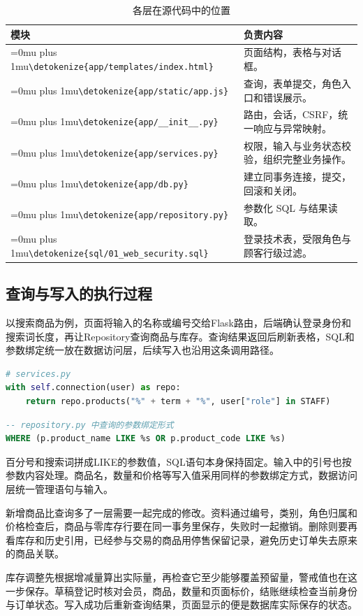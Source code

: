 \documentclass{SYSUReport}
\newcommand{\code}[1]{\begingroup\Urlmuskip=0mu plus 1mu\expandafter\nolinkurl\expandafter{\detokenize{#1}}\endgroup}
\begin{document}
\begin{table}[H]\centering\small
\begin{tabularx}{\textwidth}{P{6.0cm}Y}
\toprule 模块 & 负责内容 \\
\midrule
\code{app/templates/index.html} & 页面结构，表格与对话框。 \\
\code{app/static/app.js} & 查询，表单提交，角色入口和错误展示。 \\
\code{app/__init__.py} & 路由，会话，CSRF，统一响应与异常映射。 \\
\code{app/services.py} & 权限，输入与业务状态校验，组织完整业务操作。 \\
\code{app/db.py} & 建立同事务连接，提交，回滚和关闭。 \\
\code{app/repository.py} & 参数化 SQL 与结果读取。 \\
\code{sql/01_web_security.sql} & 登录技术表，受限角色与顾客行级过滤。 \\
\bottomrule
\end{tabularx}\caption{各层在源代码中的位置}
\end{table}

\medskip
\Needspace{0.85\textheight}
\subsection{查询与写入的执行过程}
以搜索商品为例，页面将输入的名称或编号交给Flask路由，后端确认登录身份和搜索词长度，再让Repository查询商品与库存。查询结果返回后刷新表格，SQL和参数绑定统一放在数据访问层，后续写入也沿用这条调用路径。

\begin{lstlisting}[language=Python]
# services.py
with self.connection(user) as repo:
    return repo.products("%" + term + "%", user["role"] in STAFF)
\end{lstlisting}
\begin{lstlisting}[language=SQL]
-- repository.py 中查询的参数绑定形式
WHERE (p.product_name LIKE %s OR p.product_code LIKE %s)
\end{lstlisting}
百分号和搜索词拼成LIKE的参数值，SQL语句本身保持固定。输入中的引号也按参数内容处理。商品名，数量和价格等写入值采用同样的参数绑定方式，数据访问层统一管理语句与输入。

新增商品比查询多了一层需要一起完成的修改。资料通过编号，类别，角色归属和价格检查后，商品与零库存行要在同一事务里保存，失败时一起撤销。删除则要再看库存和历史引用，已经参与交易的商品用停售保留记录，避免历史订单失去原来的商品关联。

库存调整先根据增减量算出实际量，再检查它至少能够覆盖预留量，警戒值也在这一步保存。草稿登记时核对会员，商品，数量和页面标价，结账继续检查当前身份与订单状态。写入成功后重新查询结果，页面显示的便是数据库实际保存的状态。
\end{document}
